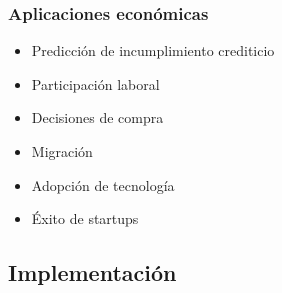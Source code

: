 \documentclass[
  doc,
  floatsintext,
  longtable,
  a4paper,
  nolmodern,
  notxfonts,
  notimes,
  12pt,
  colorlinks=true,linkcolor=blue,citecolor=blue,urlcolor=blue]{apa7}
\providecommand{\tightlist}{%
  \setlength{\itemsep}{0pt}\setlength{\parskip}{0pt}}
\begin{document}
\subsubsection{Aplicaciones
económicas}\label{aplicaciones-econuxf3micas}

\begin{itemize}
\tightlist
\item
  Predicción de incumplimiento crediticio
\item
  Participación laboral
\item
  Decisiones de compra
\item
  Migración
\item
  Adopción de tecnología
\item
  Éxito de startups
\end{itemize}

\subsection{Implementación}\label{implementaciuxf3n}
\end{document}
